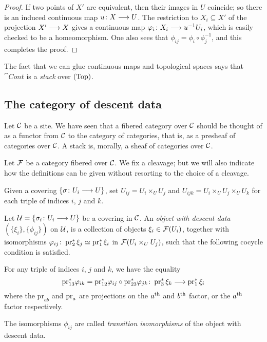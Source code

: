 \begin{4   STACKS}
\begin{4.1 Descent of objects of fibcats}
\begin{proof}
If two points of $X'$ are equivalent, then their images in $U$ coincide; so there is an induced continuous map $u \colon X \arr U$. The restriction to $X_i \subseteq X'$ of the projection $X'\arr X$ gives a continuous map $\phi_i \colon X_i \arr u^{-1}U_i$, which is easily checked to be a homeomorphism. One also sees that $\phi_{ij} = \phi_i \circ \phi_j^{-1}$, and this completes the proof.
\end{proof}

The fact that we can glue continuous maps and topological spaces says that $\cat{Cont}$ is a \emph{stack} over $(\mathrm{Top})$.



\subsection{The category of descent data}\label{subsec:descent-data}

Let $\mathcal{C}$ be a site. We have seen that a fibered category over $\mathcal{C}$ should be thought of as a functor from $\mathcal{C}$ to the category of categories, that is, as a presheaf of categories over $\mathcal{C}$. A stack is, morally, a sheaf of categories over $\mathcal{C}$.

Let $\mathcal{F}$ be a category fibered over $\mathcal{C}$. We fix a cleavage; but we will also indicate how the definitions can be given without resorting to the choice of a cleavage.

Given a covering $\{\sigma \colon U_i \arr U\}$, set $U_{ij} = U_i \times_U U_j$ and $U_{ijk} = U_i \times_U U_j \times_U U_k$ for each triple of indices $i$, $j$ and $k$.

\begin{definition}

Let $\cU = \{\sigma_i \colon U_i \arr U\}$ be a covering in $\mathcal{C}$. An \emph{object with descent data}%
 $(\{\xi_i\}, \{\phi_{ij}\})$ on $\mathcal{U}$, is a collection of objects $\xi_i \in \mathcal{F}(U_i)$, together with isomorphisms $\varphi_{ij} \colon \operatorname{pr}_2^* \xi_j \simeq \operatorname{pr}_1^* \xi_i$ in $\mathcal{F}(U_i \times_U U_j)$, such that the following cocycle condition is satisfied.

For any triple of indices $i$, $j$ and $k$, we have the equality
   \[
   \mathrm{pr}_{13}^* \phi_{ik} = \mathrm{pr}_{12}^* \phi_{ij}
   \circ \mathrm{pr}_{23}^* \phi_{jk} \colon \pr_3^*\xi_k
   \arr \pr_1^*\xi_i
   \]
where the $\mathrm{pr}_{ab}$ and $\operatorname{pr}_a$ are projections on the $a^\text{th}$ and $b^\text{th}$ factor, or the $a^\text{th}$ factor respectively.

The isomorphisms $\phi_{ij}$ are called \emph{transition isomorphisms}%
 of the object with descent data.


\end{definition}
\end{4.1 Descent of objects of fibcats}
\end{4   STACKS}
